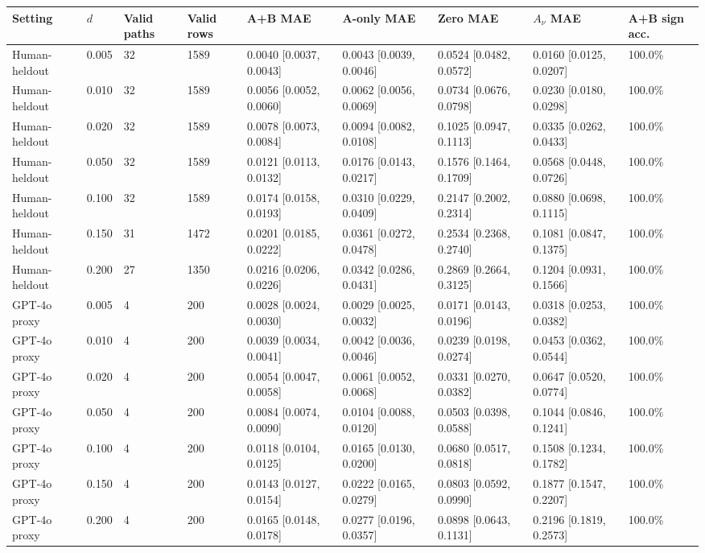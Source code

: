 \begin{tabular}{lllllllll}
\toprule
Setting & $d$ & Valid paths & Valid rows & A+B MAE & A-only MAE & Zero MAE & $A_\nu$ MAE & A+B sign acc. \\
\midrule
Human-heldout & 0.005 & 32 & 1589 & 0.0040 [0.0037, 0.0043] & 0.0043 [0.0039, 0.0046] & 0.0524 [0.0482, 0.0572] & 0.0160 [0.0125, 0.0207] & 100.0\% \\
Human-heldout & 0.010 & 32 & 1589 & 0.0056 [0.0052, 0.0060] & 0.0062 [0.0056, 0.0069] & 0.0734 [0.0676, 0.0798] & 0.0230 [0.0180, 0.0298] & 100.0\% \\
Human-heldout & 0.020 & 32 & 1589 & 0.0078 [0.0073, 0.0084] & 0.0094 [0.0082, 0.0108] & 0.1025 [0.0947, 0.1113] & 0.0335 [0.0262, 0.0433] & 100.0\% \\
Human-heldout & 0.050 & 32 & 1589 & 0.0121 [0.0113, 0.0132] & 0.0176 [0.0143, 0.0217] & 0.1576 [0.1464, 0.1709] & 0.0568 [0.0448, 0.0726] & 100.0\% \\
Human-heldout & 0.100 & 32 & 1589 & 0.0174 [0.0158, 0.0193] & 0.0310 [0.0229, 0.0409] & 0.2147 [0.2002, 0.2314] & 0.0880 [0.0698, 0.1115] & 100.0\% \\
Human-heldout & 0.150 & 31 & 1472 & 0.0201 [0.0185, 0.0222] & 0.0361 [0.0272, 0.0478] & 0.2534 [0.2368, 0.2740] & 0.1081 [0.0847, 0.1375] & 100.0\% \\
Human-heldout & 0.200 & 27 & 1350 & 0.0216 [0.0206, 0.0226] & 0.0342 [0.0286, 0.0431] & 0.2869 [0.2664, 0.3125] & 0.1204 [0.0931, 0.1566] & 100.0\% \\
GPT-4o proxy & 0.005 & 4 & 200 & 0.0028 [0.0024, 0.0030] & 0.0029 [0.0025, 0.0032] & 0.0171 [0.0143, 0.0196] & 0.0318 [0.0253, 0.0382] & 100.0\% \\
GPT-4o proxy & 0.010 & 4 & 200 & 0.0039 [0.0034, 0.0041] & 0.0042 [0.0036, 0.0046] & 0.0239 [0.0198, 0.0274] & 0.0453 [0.0362, 0.0544] & 100.0\% \\
GPT-4o proxy & 0.020 & 4 & 200 & 0.0054 [0.0047, 0.0058] & 0.0061 [0.0052, 0.0068] & 0.0331 [0.0270, 0.0382] & 0.0647 [0.0520, 0.0774] & 100.0\% \\
GPT-4o proxy & 0.050 & 4 & 200 & 0.0084 [0.0074, 0.0090] & 0.0104 [0.0088, 0.0120] & 0.0503 [0.0398, 0.0588] & 0.1044 [0.0846, 0.1241] & 100.0\% \\
GPT-4o proxy & 0.100 & 4 & 200 & 0.0118 [0.0104, 0.0125] & 0.0165 [0.0130, 0.0200] & 0.0680 [0.0517, 0.0818] & 0.1508 [0.1234, 0.1782] & 100.0\% \\
GPT-4o proxy & 0.150 & 4 & 200 & 0.0143 [0.0127, 0.0154] & 0.0222 [0.0165, 0.0279] & 0.0803 [0.0592, 0.0990] & 0.1877 [0.1547, 0.2207] & 100.0\% \\
GPT-4o proxy & 0.200 & 4 & 200 & 0.0165 [0.0148, 0.0178] & 0.0277 [0.0196, 0.0357] & 0.0898 [0.0643, 0.1131] & 0.2196 [0.1819, 0.2573] & 100.0\% \\
\bottomrule
\end{tabular}
